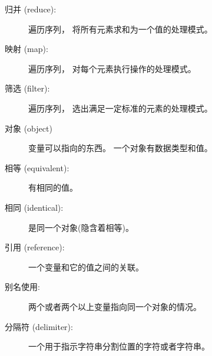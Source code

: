 \begin{description}
\item[归并 (reduce):] 遍历序列， 将所有元素求和为一个值的处理模式。
  


\item[映射 (map):] 遍历序列， 对每个元素执行操作的处理模式。
  


\item[筛选 (filter):] 遍历序列， 选出满足一定标准的元素的处理模式。
  


\item[对象 (object)] 变量可以指向的东西。  一个对象有数据类型和值。


\item[相等 (equivalent):] 有相同的值。


\item[相同 (identical):] 是同一个对象(隐含着相等)。


\item[引用 (reference):] 一个变量和它的值之间的关联。


\item[别名使用:] 两个或者两个以上变量指向同一个对象的情况。


\item[分隔符 (delimiter):] 一个用于指示字符串分割位置的字符或者字符串。

\end{description}


